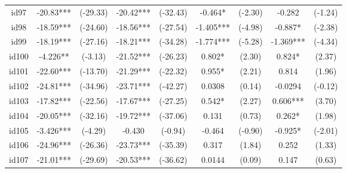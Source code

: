 \documentclass[entropy,article,submit,moreauthors,LaTeX and dvi2pdf]{Definitions/mdpi}
\begin{document}
\begin{center}
\begin{longtable}{ccccccccc}
id97                                          & -20.83***     & (-29.33)      & -20.42***       & (-32.43)         & -0.464*           & (-2.30)           & -0.282            & (-1.24)           \\
id98                                          & -18.59***     & (-24.60)      & -18.56***       & (-27.54)         & -1.405***         & (-4.98)           & -0.887*           & (-2.38)           \\
id99                                          & -18.19***     & (-27.16)      & -18.21***       & (-34.28)         & -1.774***         & (-5.28)           & -1.369***         & (-4.34)           \\
id100                                         & -4.226**      & (-3.13)       & -21.52***       & (-26.23)         & 0.802*            & (2.30)            & 0.824*            & (2.37)            \\
id101                                         & -22.60***     & (-13.70)      & -21.29***       & (-22.32)         & 0.955*            & (2.21)            & 0.814             & (1.96)            \\
id102                                         & -24.81***     & (-34.96)      & -23.71***       & (-42.27)         & 0.0308            & (0.14)            & -0.0294           & (-0.12)           \\
id103                                         & -17.82***     & (-22.56)      & -17.67***       & (-27.25)         & 0.542*            & (2.27)            & 0.606***          & (3.70)            \\
id104                                         & -20.05***     & (-32.16)      & -19.72***       & (-37.06)         & 0.131             & (0.73)            & 0.262*            & (1.98)            \\
id105                                         & -3.426***     & (-4.29)       & -0.430          & (-0.94)          & -0.464            & (-0.90)           & -0.925*           & (-2.01)           \\
id106                                         & -24.96***     & (-26.36)      & -23.73***       & (-35.39)         & 0.317             & (1.84)            & 0.252             & (1.33)            \\
id107                                         & -21.01***     & (-29.69)      & -20.53***       & (-36.62)         & 0.0144            & (0.09)            & 0.147             & (0.63)            \\

\end{longtable}
\end{center}
\end{document}
